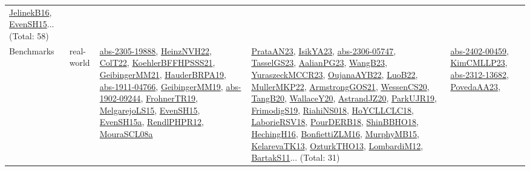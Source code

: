 {\begin{longtable}{lp{3cm}>{\raggedright}p{6cm}>{\raggedright}p{6cm}p{8cm}}
\href{papers/JelinekB16.pdf}{JelinekB16}\cite{JelinekB16}, \href{papers/EvenSH15.pdf}{EvenSH15}\cite{EvenSH15}... (Total: 58)\\
Benchmarks & real-world & \href{articles/abs-2305-19888.pdf}{abs-2305-19888}\cite{abs-2305-19888}, \href{articles/HeinzNVH22.pdf}{HeinzNVH22}\cite{HeinzNVH22}, \href{articles/ColT22.pdf}{ColT22}\cite{ColT22}, \href{articles/KoehlerBFFHPSSS21.pdf}{KoehlerBFFHPSSS21}\cite{KoehlerBFFHPSSS21}, \href{papers/GeibingerMM21.pdf}{GeibingerMM21}\cite{GeibingerMM21}, \href{articles/HauderBRPA19.pdf}{HauderBRPA19}\cite{HauderBRPA19}, \href{articles/abs-1911-04766.pdf}{abs-1911-04766}\cite{abs-1911-04766}, \href{papers/GeibingerMM19.pdf}{GeibingerMM19}\cite{GeibingerMM19}, \href{articles/abs-1902-09244.pdf}{abs-1902-09244}\cite{abs-1902-09244}, \href{papers/FrohnerTR19.pdf}{FrohnerTR19}\cite{FrohnerTR19}, \href{papers/MelgarejoLS15.pdf}{MelgarejoLS15}\cite{MelgarejoLS15}, \href{papers/EvenSH15.pdf}{EvenSH15}\cite{EvenSH15}, \href{articles/EvenSH15a.pdf}{EvenSH15a}\cite{EvenSH15a}, \href{papers/RendlPHPR12.pdf}{RendlPHPR12}\cite{RendlPHPR12}, \href{papers/MouraSCL08a.pdf}{MouraSCL08a}\cite{MouraSCL08a} & \href{articles/PrataAN23.pdf}{PrataAN23}\cite{PrataAN23}, \href{articles/IsikYA23.pdf}{IsikYA23}\cite{IsikYA23}, \href{articles/abs-2306-05747.pdf}{abs-2306-05747}\cite{abs-2306-05747}, \href{papers/TasselGS23.pdf}{TasselGS23}\cite{TasselGS23}, \href{papers/AalianPG23.pdf}{AalianPG23}\cite{AalianPG23}, \href{papers/WangB23.pdf}{WangB23}\cite{WangB23}, \href{articles/YuraszeckMCCR23.pdf}{YuraszeckMCCR23}\cite{YuraszeckMCCR23}, \href{papers/OujanaAYB22.pdf}{OujanaAYB22}\cite{OujanaAYB22}, \href{papers/LuoB22.pdf}{LuoB22}\cite{LuoB22}, \href{articles/MullerMKP22.pdf}{MullerMKP22}\cite{MullerMKP22}, \href{papers/ArmstrongGOS21.pdf}{ArmstrongGOS21}\cite{ArmstrongGOS21}, \href{papers/WessenCS20.pdf}{WessenCS20}\cite{WessenCS20}, \href{papers/TangB20.pdf}{TangB20}\cite{TangB20}, \href{articles/WallaceY20.pdf}{WallaceY20}\cite{WallaceY20}, \href{articles/AstrandJZ20.pdf}{AstrandJZ20}\cite{AstrandJZ20}, \href{papers/ParkUJR19.pdf}{ParkUJR19}\cite{ParkUJR19}, \href{papers/FrimodigS19.pdf}{FrimodigS19}\cite{FrimodigS19}, \href{papers/RiahiNS018.pdf}{RiahiNS018}\cite{RiahiNS018}, \href{papers/HoYCLLCLC18.pdf}{HoYCLLCLC18}\cite{HoYCLLCLC18}, \href{articles/LaborieRSV18.pdf}{LaborieRSV18}\cite{LaborieRSV18}, \href{articles/PourDERB18.pdf}{PourDERB18}\cite{PourDERB18}, \href{articles/ShinBBHO18.pdf}{ShinBBHO18}\cite{ShinBBHO18}, \href{papers/HechingH16.pdf}{HechingH16}\cite{HechingH16}, \href{papers/BonfiettiZLM16.pdf}{BonfiettiZLM16}\cite{BonfiettiZLM16}, \href{papers/MurphyMB15.pdf}{MurphyMB15}\cite{MurphyMB15}, \href{papers/KelarevaTK13.pdf}{KelarevaTK13}\cite{KelarevaTK13}, \href{articles/OzturkTHO13.pdf}{OzturkTHO13}\cite{OzturkTHO13}, \href{articles/LombardiM12.pdf}{LombardiM12}\cite{LombardiM12}, \href{articles/BartakS11.pdf}{BartakS11}\cite{BartakS11}... (Total: 31) & \href{articles/abs-2402-00459.pdf}{abs-2402-00459}\cite{abs-2402-00459}, \href{papers/KimCMLLP23.pdf}{KimCMLLP23}\cite{KimCMLLP23}, \href{articles/abs-2312-13682.pdf}{abs-2312-13682}\cite{abs-2312-13682}, \href{papers/PovedaAA23.pdf}{PovedaAA23}\cite{PovedaAA23}, 
\end{longtable}}
